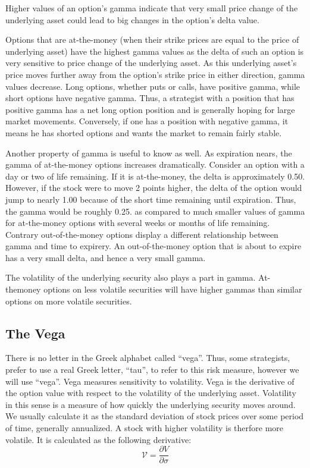 \documentclass[a4paper, 12pt]{article}
\theoremstyle{definition}
\theoremstyle{plain}
\begin{document}
Higher values of an option's gamma indicate that very small 
price change of the underlying asset could lead to 
big changes in the option's delta value.

Options that are at-the-money (when their strike prices 
are equal to the price of underlying asset) have the 
highest gamma values as the delta of such an option is 
very sensitive to price change of the underlying asset. 
As this underlying asset's price moves further away 
from the option's strike price in either direction, 
gamma values decrease. 
Long options, whether puts or calls, have positive gamma, while short options
have negative gamma. Thus, a strategist with a position that has positive gamma has
a net long option position and is generally hoping for large market movements.
Conversely, if one has a position with negative gamma, it means he has shorted
options and wants the market to remain fairly stable. 
 
Another property of gamma is useful to know as well. 
As expiration nears, the gamma of at-the-money options increases dramatically.  
Consider an option with a day
or two of life remaining. If it is at-the-money, the delta is approximately 0.50.
However, if the stock were to move 2 points higher, the delta of the option would jump 
to nearly 1.00 because of the short time remaining until expiration. Thus, the gamma
would be roughly 0.25. as compared to much smaller values of gamma for at-the-money options with several
weeks or months of life remaining.
Contrary out-of-the-money options display a different relationship between gamma and
time to expirery. An out-of-the-money option that is about to expire has a very small
delta, and hence a very small gamma.

The volatility of the underlying security also plays a part in gamma. 
At-themoney options on less volatile securities will have higher gammas than similar options
on more volatile securities. 


\subsection{The Vega}

There is no letter in the Greek alphabet called ``vega''.
Thus, some strategists, prefer to use a real Greek letter, 
``tau'', to refer to this risk measure, however 
we will use ``vega''.
Vega measures sensitivity to volatility. 
Vega is the derivative of the option value with respect to the volatility of the underlying asset.
Volatility in this sense is a measure of how quickly the underlying security moves around. 
We usually calculate it as the standard deviation of stock prices over some
period of time, generally annualized.
A stock with higher volatility is therfore more volatile.
It is calculated as the following derivative:
$$ 
\mathcal{V}  = \frac{\partial V}{\partial \sigma}
$$
\end{document}
